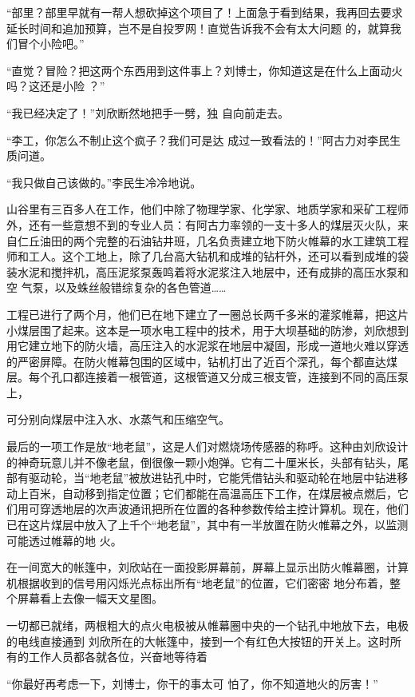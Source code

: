 \documentclass{article}
\begin{document}
“部里？部里早就有一帮人想砍掉这个项目了！上面急于看到结果，我再回去要求延长时间和追加预算，岂不是自投罗网！直觉告诉我不会有太大问题
的，就算我们冒个小险吧。” 

“直觉？冒险？把这两个东西用到这件事上？刘博士，你知道这是在什么上面动火吗？这还是小险
？” 

“我已经决定了！”刘欣断然地把手一劈，独
自向前走去。 

“李工，你怎么不制止这个疯子？我们可是达
成过一致看法的！”阿古力对李民生质问道。 

\newpage


“我只做自己该做的。”李民生冷冷地说。 


山谷里有三百多人在工作，他们中除了物理学家、化学家、地质学家和采矿工程师外，还有一些意想不到的专业人员：有阿古力率领的一支十多人的煤层灭火队，来自仁丘油田的两个完整的石油钻井班，几名负责建立地下防火帷幕的水工建筑工程师和工人。这个工地上，除了几台高大钻机和成堆的钻杆外，还可以看到成堆的袋装水泥和搅拌机，高压泥浆泵轰鸣着将水泥浆注入地层中，还有成排的高压水泵和空
气泵，以及蛛丝般错综复杂的各色管道…… 

工程已进行了两个月，他们已在地下建立了一圈总长两千多米的灌浆帷幕，把这片小煤层围了起来。这本是一项水电工程中的技术，用于大坝基础的防渗，刘欣想到用它建立地下的防火墙，高压注入的水泥浆在地层中凝固，形成一道地火难以穿透的严密屏障。在防火帷幕包围的区域中，钻机打出了近百个深孔，每个都直达煤层。每个孔口都连接着一根管道，这根管道又分成三根支管，连接到不同的高压泵上，
\newpage

可分别向煤层中注入水、水蒸气和压缩空气。 

最后的一项工作是放“地老鼠”，这是人们对燃烧场传感器的称呼。这种由刘欣设计的神奇玩意儿并不像老鼠，倒很像一颗小炮弹。它有二十厘米长，头部有钻头，尾部有驱动轮，当“地老鼠”被放进钻孔中时，它能凭借钻头和驱动轮在地层中钻进移动上百米，自动移到指定位置；它们都能在高温高压下工作，在煤层被点燃后，它们用可穿透地层的次声波通讯把所在位置的各种参数传给主控计算机。现在，他们已在这片煤层中放入了上千个“地老鼠”，其中有一半放置在防火帷幕之外，以监测可能透过帷幕的地
火。 

在一间宽大的帐篷中，刘欣站在一面投影屏幕前，屏幕上显示出防火帷幕圈，计算机根据收到的信号用闪烁光点标出所有“地老鼠”的位置，它们密密
地分布着，整个屏幕看上去像一幅天文星图。 

一切都已就绪，两根粗大的点火电极被从帷幕圈中央的一个钻孔中地放下去，电极的电线直接通到
\newpage
刘欣所在的大帐篷中，接到一个有红色大按钮的开关上。这时所有的工作人员都各就各位，兴奋地等待着

“你最好再考虑一下，刘博士，你干的事太可
怕了，你不知道地火的厉害！” 
\end{document}
